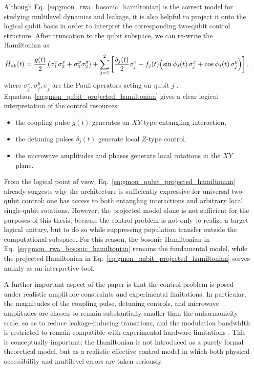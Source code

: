 Although Eq.~\eqref{eq:gmon_rwa_bosonic_hamiltonian} is the correct model for studying multilevel dynamics and leakage, it is also helpful to project it onto the logical qubit basis in order to interpret the corresponding two-qubit control structure. After truncation to the qubit subspace, we can re-write the Hamiltonian as
\begin{equation}
\hat{H}_{\mathrm{qb}}(t)
=
\frac{g(t)}{2}
\left(
\sigma_{1}^{x}\sigma_{2}^{x}
+
\sigma_{1}^{y}\sigma_{2}^{y}
\right)
+
\sum_{j=1}^{2}
\left[
\frac{\delta_{j}(t)}{2}\sigma_{j}^{z}
-
f_{j}(t)
\Bigl(
\sin\phi_{j}(t)\,\sigma_{j}^{x}
+
\cos\phi_{j}(t)\,\sigma_{j}^{y}
\Bigr)
\right],
\label{eq:gmon_qubit_projected_hamiltonian}
\end{equation}
where $\sigma_j^{x},\sigma_j^{y},\sigma_j^{z}$ are the Pauli operators acting on qubit $j$ \cite{Niu2019}. Equation~\eqref{eq:gmon_qubit_projected_hamiltonian} gives a clear logical interpretation of the control resources:
\begin{itemize}
\item the coupling pulse $g(t)$ generates an \(XY\)-type entangling interaction,
\item the detuning pulses $\delta_j(t)$ generate local \(Z\)-type control,
\item the microwave amplitudes and phases generate local rotations in the \(XY\) plane.
\end{itemize}

From the logical point of view, Eq.~\eqref{eq:gmon_qubit_projected_hamiltonian} already suggests why the architecture is sufficiently expressive for universal two-qubit control: one has access to both entangling interactions and arbitrary local single-qubit rotations. However, the projected model alone is not sufficient for the purposes of this thesis, because the control problem is not only to realize a target logical unitary, but to do so while suppressing population transfer outside the computational subspace. For this reason, the bosonic Hamiltonian in Eq.~\eqref{eq:gmon_rwa_bosonic_hamiltonian} remains the fundamental model, while the projected Hamiltonian in Eq.~\eqref{eq:gmon_qubit_projected_hamiltonian} serves mainly as an interpretive tool.

A further important aspect of the paper is that the control problem is posed under realistic amplitude constraints and experimental limitations. In particular, the magnitudes of the coupling pulse, detuning controls, and microwave amplitudes are chosen to remain substantially smaller than the anharmonicity scale, so as to reduce leakage-inducing transitions, and the modulation bandwidth is restricted to remain compatible with experimental hardware limitations \cite{Niu2019}. This is conceptually important: the Hamiltonian is not introduced as a purely formal theoretical model, but as a realistic effective control model in which both physical accessibility and multilevel errors are taken seriously.


